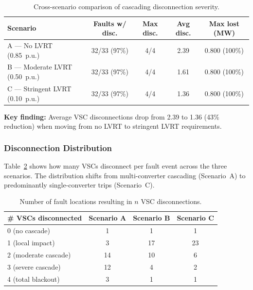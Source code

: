 \begin{table}[htbp]
    \centering
    \caption{Cross-scenario comparison of cascading disconnection severity.}
    \label{tab:cross_scenario}
    \begin{tabular}{lcccc}
        \toprule
        \textbf{Scenario} & \textbf{Faults w/ disc.} & \textbf{Max disc.} & \textbf{Avg disc.} & \textbf{Max lost (MW)} \\
        \midrule
        A --- No LVRT (0.85~p.u.)       & 32/33 (97\%) & 4/4 & 2.39 & 0.800 (100\%) \\
        B --- Moderate LVRT (0.50~p.u.)  & 32/33 (97\%) & 4/4 & 1.61 & 0.800 (100\%) \\
        C --- Stringent LVRT (0.10~p.u.) & 32/33 (97\%) & 4/4 & 1.36 & 0.800 (100\%) \\
        \bottomrule
    \end{tabular}
\end{table}

\textbf{Key finding:} Average VSC disconnections drop from 2.39 to 1.36 (43\% reduction) when moving from no LVRT to stringent LVRT requirements.


\subsubsection{Disconnection Distribution}

Table~\ref{tab:disc_distribution} shows how many VSCs disconnect per fault event across the three scenarios. The distribution shifts from multi-converter cascading (Scenario~A) to predominantly single-converter trips (Scenario~C).

\begin{table}[htbp]
    \centering
    \caption{Number of fault locations resulting in $n$ VSC disconnections.}
    \label{tab:disc_distribution}
    \begin{tabular}{lccc}
        \toprule
        \textbf{\# VSCs disconnected} & \textbf{Scenario A} & \textbf{Scenario B} & \textbf{Scenario C} \\
        \midrule
        0 (no cascade)        &  1 &  1 &  1 \\
        1 (local impact)      &  3 & 17 & 23 \\
        2 (moderate cascade)  & 14 & 10 &  6 \\
        3 (severe cascade)    & 12 &  4 &  2 \\
        4 (total blackout)    &  3 &  1 &  1 \\
        \bottomrule
    \end{tabular}
\end{table}


